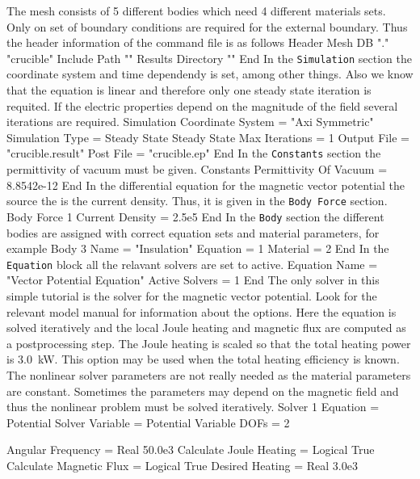 The mesh consists of 5 different bodies which need 4
different materials sets. Only on set of boundary conditions 
are required for the external boundary. Thus the header 
information of the command file is as follows
\ttbegin
Header
  Mesh DB "." "crucible"
  Include Path ""
  Results Directory ""
End
\ttend
%
In the \texttt{Simulation} section the coordinate system and
time dependendy is set, among other things. Also we know that
the equation is linear and therefore only one steady state
iteration is requited. If the electric properties depend on 
the magnitude of the field several iterations are required.
\ttbegin
Simulation
  Coordinate System = "Axi Symmetric"
  Simulation Type = Steady State
  Steady State Max Iterations = 1
  Output File = "crucible.result"
  Post File = "crucible.ep"
End
\ttend
%
In the \texttt{Constants} section the permittivity of 
vacuum must be given.
\ttbegin
Constants
  Permittivity Of Vacuum = 8.8542e-12
End
\ttend
%
In the differential equation for the magnetic vector potential the 
source the is the current density. Thus, it is given in the
\texttt{Body Force} section. 
\ttbegin
Body Force 1
  Current Density = 2.5e5
End
\ttend
%
In the \texttt{Body} section the different bodies are assigned 
with correct equation sets and material parameters, for example
\ttbegin
Body 3
  Name = "Insulation"
  Equation = 1
  Material = 2
End
\ttend
%
In the \texttt{Equation} block all the relavant solvers are 
set to active.
\ttbegin
Equation
  Name = "Vector Potential Equation"
  Active Solvers = 1
End
\ttend
%
The only solver in this simple tutorial is the solver for the magnetic
vector potential. Look for the relevant model manual for information
about the options. Here the equation is solved iteratively and the
local Joule heating and magnetic flux are computed as a postprocessing
step. The Joule heating is scaled so that the total heating power is
3.0~kW. This option may be used when the total heating efficiency is
known.  The nonlinear solver parameters are not really needed as the
material parameters are constant. Sometimes the parameters may depend
on the magnetic field and thus the nonlinear problem must be solved
iteratively.
%
\ttbegin
Solver 1
  Equation = Potential Solver
  Variable = Potential
  Variable DOFs = 2

  Angular Frequency = Real 50.0e3
  Calculate Joule Heating = Logical True
  Calculate Magnetic Flux = Logical True
  Desired Heating = Real 3.0e3

